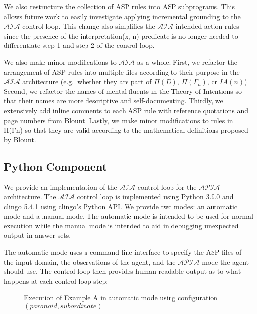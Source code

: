 We also restructure the collection of ASP rules into ASP subprograms.
This allows future work to easily investigate applying incremental grounding to the $\mathcal{AIA}$ control loop.
This change also simplifies the $\mathcal{AIA}$ intended action rules since the presence of the interpretation(x, n) predicate is no longer needed to differentiate step 1 and step 2 of the control loop.

We also make minor modifications to $\mathcal{AIA}$ as a whole.
First, we refactor the arrangement of ASP rules into multiple files according to their purpose in the $\mathcal{AIA}$ architecture (e.g.~whether they are part of $\Pi(D)$, $\Pi(\Gamma_n)$, or $IA(n)$)
Second, we refactor the names of mental fluents in the Theory of Intentions so that their names are more descriptive and self-documenting.
Thirdly, we extensively add inline comments to each ASP rule with reference quotations and page numbers from Blount.
Lastly, we make minor modifications to rules in Π(Γn) so that they are valid according to the mathematical definitions proposed by Blount.

\subsection{Python Component}

We provide an implementation of the $\mathcal{AIA}$ control loop for the $\mathcal{APIA}$ architecture.
The $\mathcal{AIA}$ control loop is implemented using Python 3.9.0 and clingo 5.4.1 using clingo's Python API.
We provide two modes: an automatic mode and a manual mode.
The automatic mode is intended to be used for normal execution while the manual mode is intended to aid in debugging unexpected output in answer sets.

The automatic mode uses a command-line interface to specify the ASP files of the input domain, the observations of the agent, and the $\mathcal{APIA}$ mode the agent should use.
The control loop then provides human-readable output as to what happens at each control loop step:

\begin{figure}[h]
    \centering
    
    \caption{Execution of Example A in automatic mode using configuration $(paranoid, subordinate)$}
    \label{fig:apia_example_a_execution_paraniod_subordinate}
\end{figure}

